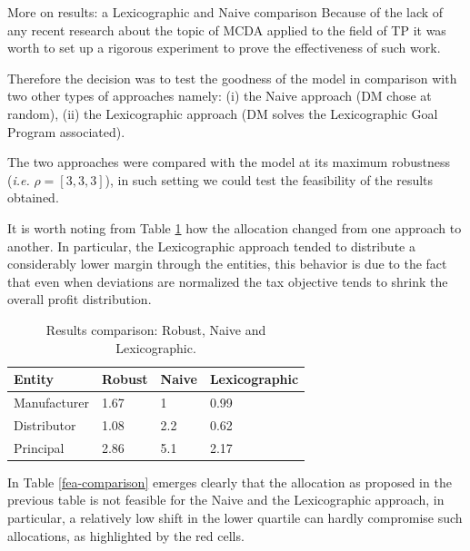 \documentclass[10pt]{beamer}
\begin{document}
\begin{frame}[allowframebreaks]{More on results: a Lexicographic and Naive comparison}
  Because of the lack of any recent research\cite{merville1978} about the topic of MCDA applied to the field of TP it was worth to set up a rigorous experiment to prove the effectiveness of such work.

  Therefore the decision was to test the goodness of the model in comparison with two other types of approaches namely: (i) the Naive approach (DM chose at random), (ii) the Lexicographic approach (DM solves the Lexicographic Goal Program associated).

  The two approaches were compared with the model at its maximum robustness (\emph{i.e.} $\rho=[3,3,3]$), in such setting we could test the feasibility of the results obtained.

  \pagebreak
  
  It is worth noting from Table \ref{res-comparison} how the allocation changed from one approach to another. In particular, the Lexicographic approach tended to distribute a considerably lower margin through the entities, this behavior is due to the fact that even when deviations are normalized the tax objective tends to shrink the overall profit distribution.
  
  \begin{table}[]
\centering
\caption{Results comparison: Robust, Naive and Lexicographic.}
\label{res-comparison}
\begin{tabular}{@{}llll@{}}
\toprule
  Entity       & Robust & Naive & Lexicographic \\ \midrule
  Manufacturer & 1.67   & 1     & 0.99     \\ 
  Distributor  & 1.08   & 2.2   & 0.62     \\
  Principal    & 2.86   & 5.1   & 2.17     \\ \bottomrule
\end{tabular}
\end{table}

\pagebreak

In Table \ref{fea-comparison} emerges clearly that the allocation as proposed in the previous table is not feasible for the Naive and the Lexicographic approach, in particular, a relatively low shift in the lower quartile can hardly compromise such allocations, as highlighted by the red cells.


\end{frame}
\end{document}
